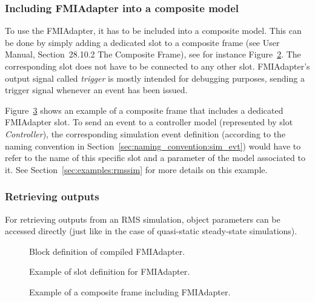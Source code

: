 \subsubsection*{Including \dslmodel FMIAdapter into a composite model}

To use the \dslmodel FMIAdapter, it has to be included into a composite model.
This can be done by simply adding a dedicated slot to a composite frame (see \pf User Manual, Section~28.10.2 The Composite Frame), see for instance Figure~\ref{fig:fmiadapter_slot}.
The corresponding slot does not have to be connected to any other slot.
FMIAdapter's output signal called \emph{trigger} is mostly intended for debugging purposes, sending a trigger signal whenever an event has been issued.

Figure~\ref{fig:fmiadapterconfig_composite_frame} shows an example of a composite frame that includes a dedicated FMIAdapter slot.
To send an event to a controller model (represented by slot \emph{Controller}), the corresponding simulation event definition (according to the naming convention in Section~\ref{sec:naming_convention:sim_evt}) would have to refer to the name of this specific slot and a parameter of the model associated to it.
See Section~\ref{sec:examples:rmssim} for more details on this example.

\subsubsection*{Retrieving outputs}

For retrieving outputs from an RMS simulation, object parameters can be accessed directly (just like in the case of quasi-static steady-state simulations).


\begin{figure}[h!]
\vspace*{1em}
\caption{Block definition of compiled \dslmodel FMIAdapter.}
\label{fig:fmiadapter_model_definition}
\end{figure}

\begin{figure}[h!]
\vspace*{1em}
\caption{Example of slot definition for \dslmodel FMIAdapter.}
\label{fig:fmiadapter_slot}
\end{figure}

\clearpage

\begin{figure}[h!]
\vspace*{2em}
\caption{Example of a composite frame including \dslmodel FMIAdapter.}
\label{fig:fmiadapterconfig_composite_frame}
\end{figure}


